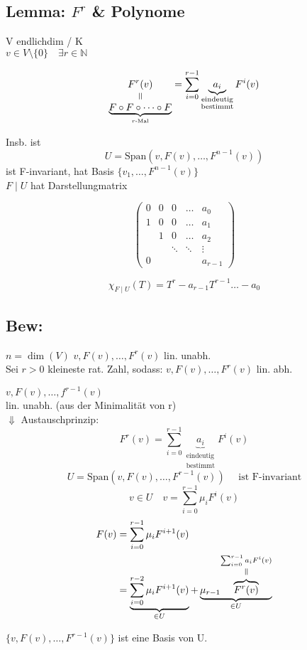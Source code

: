 \documentclass[titlepage,12pt,a4paper,ngerman]{report}
\newcommand{\verteq}{\rotatebox{90}{$\,=$}}
\newcommand{\equalto}[2]{\underset{\scriptstyle\overset{\mkern4mu\verteq}{#2}}{#1}}
\newcommand{\equaltoup}[2]{\overset{\scriptstyle\underset{\mkern4mu\verteq}{#2}}{#1}}
\newcommand{\tx}[1]{\textrm{#1}}
\newcommand{\ub}[1]{\underbrace{#1}}
\newcommand{\ob}[1]{\overbrace{#1}}
\begin{document}
\subsection{Lemma: $ F^r $ \& Polynome}
V endlichdim / K \\
$v\in V \setminus \{0\} \quad \exists r \in \mathbb{N}$

$$\equalto{F^r(v)}{ \underbrace{F \circ F \circ \dots \circ F}_{r \textrm{-Mal}}} = \sum ^{r-1}_{i=0} \underbrace{a_i}_{\substack{\textrm{eindeutig} \\ \textrm{bestimmt}}} F^i(v)$$

Insb. ist
$$U = \textrm{Span}(v, F(v), \dots , F^{n-1}(v))$$
ist F-invariant, hat Basis $\{v_1, \dots, F^{n-1}(v)\}$\\
$F \mid U$ hat Darstellungmatrix

$$\begin{pmatrix}
0 & 0 & 0 & \dots & a_0 \\
1 & 0 & 0 & \dots & a_1 \\
& 1 & 0 & \dots & a_2 \\
&   &   \ddots & \ddots & \vdots \\
0  &   &   &   & a_{r-1}
\end{pmatrix} $$

$$\chi_{F \mid U}(T) = T^r - a_{r-1} T^{r-1} \dots - a_{0}$$
\subsection{Bew:}
$ n = \dim(V)$
$v, F(v), \dots , F^r(v)$ lin. unabh.\\
Sei $r>0$ kleineste rat. Zahl, sodass:
$v,F(v), \dots , F^r(v)$ lin. abh.

$v, F(v) , \dots , f^{r-1}(v) $\\
lin. unabh. (aus der Minimalität von r)\\
$\Downarrow$ Austauschprinzip:
$$F^r(v) = \sum^{r-1}_{i=0} \ub{a_i}_{\substack{\textrm{eindeutig} \\ \textrm{bestimmt}}} F^i(v)$$
$$ U = \tx{Span} (v, F(v), \dots , F^{r-1}(v)) \quad \tx{ ist F-invariant}$$
$$v\in U \quad v = \sum^{r-1}_{i=0} \mu_i F^i(v)$$
\begin{align*}
F(v) & = \sum^{r-1}_{i=0} \mu_i F^{i+1}(v) \\
& = \ub{\sum^{r-2}_{i=0} \mu_i F^{i+1}(v)}_{\in U} + \ub{\mu_{r-1} \equaltoup{\ob{F^r(v)}}{\sum^{r-1}_{i=0} a_i F^i(v)}}_{\in U }
\end{align*}

$\{v, F(v), \dots , F^{r-1}(v)\}$ ist eine Basis von U.
\end{document}
